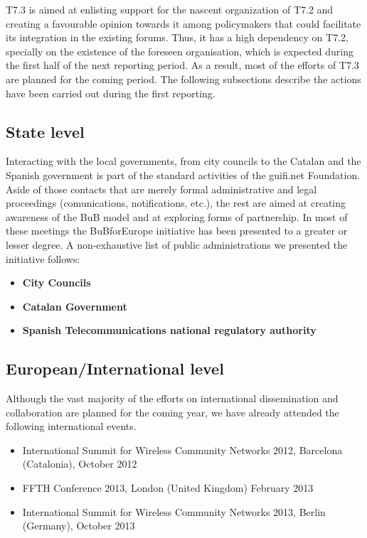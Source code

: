 T7.3 is aimed at enlisting support for the nascent organization of T7.2 and creating a favourable opinion towards it among policymakers that could facilitate its integration in the existing forums. Thus, it has a high dependency on T7.2, specially on the existence of the foreseen organisation, which is expected during the first half of the next reporting period. As a result, most of the efforts of T7.3 are planned for the coming period. The following subsections describe the actions have been carried out during the first reporting.

\subsection{State level}
Interacting with the local governments, from city councils to the Catalan and the Spanish government is part of the standard activities of the guifi.net Foundation. Aside of those contacts that are merely formal administrative and legal proceedings (comunications, notifications, etc.), the rest are aimed at creating awareness of the BuB model and at exploring forms of partnership. In most of these meetings the BuBforEurope initiative has been presented to a greater or lesser degree. A non-exhaustive list of public administrations we presented the initiative follows:

\begin{itemize}
  \setlength{\itemindent}{2em}
  \item \textbf{City Councils}
  \item \textbf{Catalan Government} 
  \item \textbf{Spanish Telecommunications national regulatory authority} 
\end{itemize}


\subsection{European/International level}
Although the vast majority of the efforts on international dissemination and collaboration are planned for the coming year, we have already attended the following international events.

\begin{itemize}
  \item International Summit for Wireless Community Networks 2012, Barcelona (Catalonia), October 2012
  \item FFTH Conference 2013, London (United Kingdom) February 2013
  \item International Summit for Wireless Community Networks 2013, Berlin (Germany), October 2013
\end{itemize}

